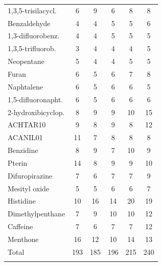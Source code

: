 \documentclass[prl,aps,twocolumn,showpacs,twocolumngrid,superbib]{revtex4}
\begin{document}
\begin{table}[h]
\begin{tabular}{lccccc}
1,3,5-trisilacycl.     &   6    &   9    &    6    &    8   &   8     \\
Benzaldehyde           &   4    &   4    &    5    &    5   &   6     \\
1,3-difluorobenz.      &   4    &   4    &    5    &    5   &   5     \\
1,3,5-trifluorob.      &   3    &   4    &    4    &    4   &   5     \\
Neopentane             &   5    &   4    &    4    &    5   &   5     \\
Furan                  &   6    &   5    &    6    &    7   &   8     \\
Naphtalene             &   6    &   5    &    6    &    6   &   5     \\
1,5-difluoronapht.     &   6    &   5    &    6    &    6   &   6     \\
2-hydroxibicyclop.     &   8    &   9    &    9    &   10   &  15     \\
ACHTAR10               &   9    &   8    &    9    &    8   &  12     \\
ACANIL01               &  11    &   7    &    8    &    8   &   8     \\
Benzidine              &   8    &   9    &    7    &   10   &   9     \\
Pterin                 &  14    &   8    &    9    &    9   &  10     \\
Difuropirazine         &   7    &   6    &    7    &    7   &   9     \\
Mesityl oxide          &   5    &   5    &    6    &    6   &   7     \\
Histidine              &  10    &  16    &   14    &   20   &  19     \\
Dimethylpenthane       &   7    &   9    &   10    &   10   &  12     \\
Caffeine               &   7    &   6    &    7    &    7   &  12     \\
Menthone               &  16    &  12    &   10    &   14   &  13     \\
\colrule
Total                  & 193    & 185    &  196    &  215   & 240     \\
\botrule
\end{tabular}
\end{table}
\end{document}
